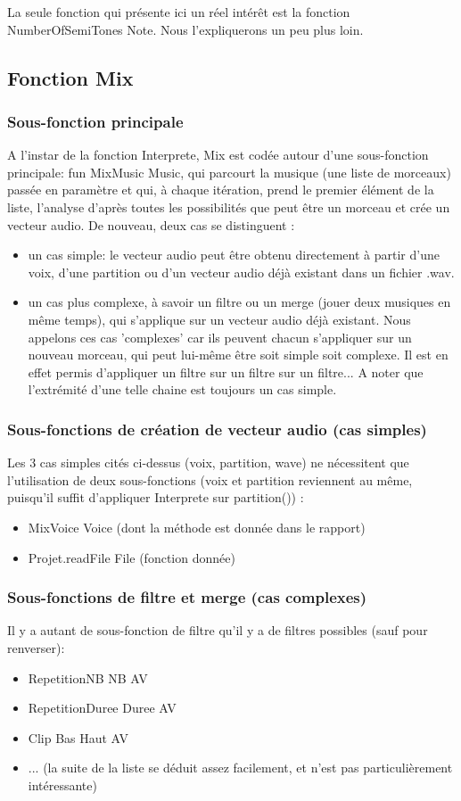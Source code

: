 \documentclass[10pt,a4paper]{article}
\begin{document}
La seule fonction qui présente ici un réel intérêt est la fonction {NumberOfSemiTones Note}. Nous l'expliquerons un peu plus loin.

\subsection{Fonction Mix}
\subsubsection{Sous-fonction principale}
A l'instar de la fonction Interprete, Mix est codée autour d'une sous-fonction principale: 
fun {MixMusic Music}, qui parcourt la musique (une liste de morceaux) passée en paramètre 
et qui, à chaque itération, prend le premier élément de la liste, l'analyse d'après toutes
 les possibilités que peut être un morceau et crée un vecteur audio. 
De nouveau, deux cas se distinguent :
\begin{itemize}
	\item un cas simple: le vecteur audio peut être obtenu directement à partir d'une voix, 
				d'une partition ou d'un vecteur audio déjà existant dans un fichier .wav.
	\item un cas plus complexe, à savoir un filtre ou un merge (jouer deux musiques en même temps),
				qui s'applique sur un vecteur audio déjà existant. Nous appelons ces cas 'complexes' car ils 
				peuvent chacun s'appliquer sur un nouveau morceau, qui peut lui-même être soit simple soit complexe.
				Il est en effet permis d'appliquer un filtre sur un filtre sur un filtre... A noter que l'extrémité 
				d'une telle chaine est toujours un cas simple.
\end{itemize}

\subsubsection{Sous-fonctions de création de vecteur audio (cas simples)}
Les 3 cas simples cités ci-dessus (voix, partition, wave)  ne nécessitent que l'utilisation
de deux sous-fonctions (voix et partition reviennent au même, puisqu'il suffit d'appliquer Interprete sur partition()) :
\begin{itemize}
	\item {MixVoice Voice} (dont la méthode est donnée dans le rapport)
	\item {Projet.readFile File} (fonction donnée)
\end{itemize}

\subsubsection{Sous-fonctions de filtre et merge (cas complexes)}
Il y a autant de sous-fonction de filtre qu'il y a de filtres possibles (sauf pour renverser):
\begin{itemize}
	\item  {RepetitionNB NB AV}
	\item {RepetitionDuree Duree AV}
	\item {Clip Bas Haut AV}
	\item ... (la suite de la liste se déduit assez facilement, et n'est pas particulièrement intéressante)
\end{itemize}
\end{document}
